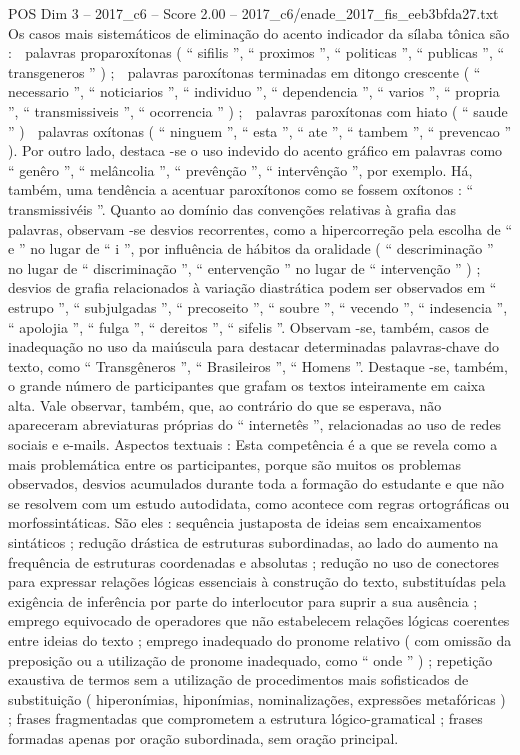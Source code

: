 \begin{textsample}{POS Dim 3 – 2017\_c6 – Score 2.00 – 2017\_c6/enade\_2017\_fis\_eeb3bfda27.txt}
Os casos mais sistemáticos de eliminação do acento indicador da sílaba tônica são :  palavras proparoxítonas ( “ sifilis ”, “ proximos ”, “ politicas ”, “ publicas ”, “ transgeneros ” ) ;  palavras paroxítonas terminadas em ditongo crescente ( “ necessario ”, “ noticiarios ”, “ individuo ”, “ dependencia ”, “ varios ”, “ propria ”, “ transmissiveis ”, “ ocorrencia ” ) ;  palavras paroxítonas com hiato ( “ saude ” )  palavras oxítonas ( “ ninguem ”, “ esta ”, “ ate ”, “ tambem ”, “ prevencao ” ).
Por outro lado, destaca -se o uso indevido do acento gráfico em palavras como “ genêro ”, “ melâncolia ”, “ prevênção ”, “ intervênção ”, por exemplo.
Há, também, uma tendência a acentuar paroxítonos como se fossem oxítonos : “ transmissivéis ”.
Quanto ao domínio das convenções relativas à grafia das palavras, observam -se desvios recorrentes, como a hipercorreção pela escolha de “ e ” no lugar de “ i ”, por influência de hábitos da oralidade ( “ descriminação ” no lugar de “ discriminação ”, “ entervenção ” no lugar de “ intervenção ” ) ; desvios de grafia relacionados à variação diastrática podem ser observados em “ estrupo ”, “ subjulgadas ”, “ precoseito ”, “ soubre ”, “ vecendo ”, “ indesencia ”, “ apolojia ”, “ fulga ”, “ dereitos ”, “ sifelis ”.
Observam -se, também, casos de inadequação no uso da maiúscula para destacar determinadas palavras-chave do texto, como “ Transgêneros ”, “ Brasileiros ”, “ Homens ”.
Destaque -se, também, o grande número de participantes que grafam os textos inteiramente em caixa alta.
Vale observar, também, que, ao contrário do que se esperava, não apareceram abreviaturas próprias do “ internetês ”, relacionadas ao uso de redes sociais e e-mails.
Aspectos textuais : Esta competência é a que se revela como a mais problemática entre os participantes, porque são muitos os problemas observados, desvios acumulados durante toda a formação do estudante e que não se resolvem com um estudo autodidata, como acontece com regras ortográficas ou morfossintáticas.
São eles : sequência justaposta de ideias sem encaixamentos sintáticos ; redução drástica de estruturas subordinadas, ao lado do aumento na frequência de estruturas coordenadas e absolutas ; redução no uso de conectores para expressar relações lógicas essenciais à construção do texto, substituídas pela exigência de inferência por parte do interlocutor para suprir a sua ausência ; emprego equivocado de operadores que não estabelecem relações lógicas coerentes entre ideias do texto ; emprego inadequado do pronome relativo ( com omissão da preposição ou a utilização de pronome inadequado, como “ onde ” ) ; repetição exaustiva de termos sem a utilização de procedimentos mais sofisticados de substituição ( hiperonímias, hiponímias, nominalizações, expressões metafóricas ) ; frases fragmentadas que comprometem a estrutura lógico-gramatical ; frases formadas apenas por oração subordinada, sem oração principal.

\end{textsample}
